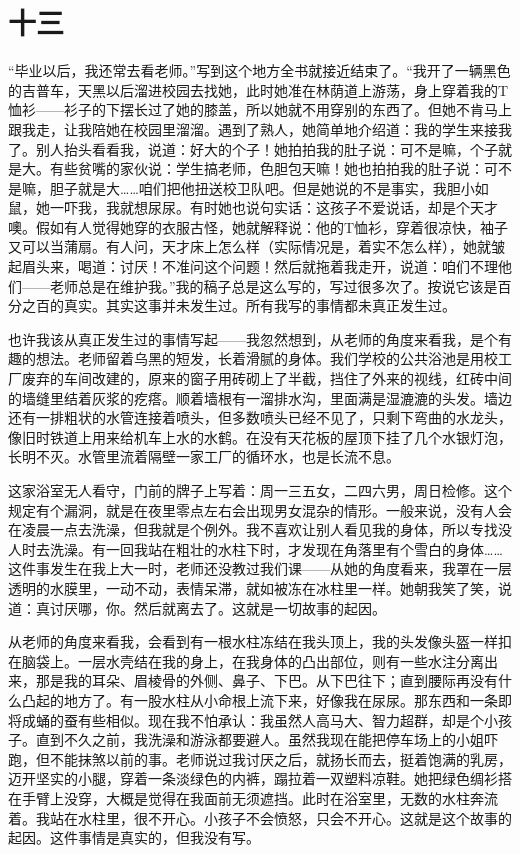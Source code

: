 \section*{十三}

“毕业以后，我还常去看老师。”写到这个地方全书就接近结束了。“我开了一辆黑色的吉普车，天黑以后溜进校园去找她，此时她准在林荫道上游荡，身上穿着我的T恤衫——衫子的下摆长过了她的膝盖，所以她就不用穿别的东西了。但她不肯马上跟我走，让我陪她在校园里溜溜。遇到了熟人，她简单地介绍道：我的学生来接我了。别人抬头看看我，说道：好大的个子！她拍拍我的肚子说：可不是嘛，个子就是大。有些贫嘴的家伙说：学生搞老师，色胆包天嘛！她也拍拍我的肚子说：可不是嘛，胆子就是大……咱们把他扭送校卫队吧。但是她说的不是事实，我胆小如鼠，她一吓我，我就想尿尿。有时她也说句实话：这孩子不爱说话，却是个天才噢。假如有人觉得她穿的衣服古怪，她就解释说：他的T恤衫，穿着很凉快，袖子又可以当蒲扇。有人问，天才床上怎么样（实际情况是，着实不怎么样），她就皱起眉头来，喝道：讨厌！不准问这个问题！然后就拖着我走开，说道：咱们不理他们——老师总是在维护我。”我的稿子总是这么写的，写过很多次了。按说它该是百分之百的真实。其实这事并未发生过。所有我写的事情都未真正发生过。 

也许我该从真正发生过的事情写起——我忽然想到，从老师的角度来看我，是个有趣的想法。老师留着乌黑的短发，长着滑腻的身体。我们学校的公共浴池是用校工厂废弃的车间改建的，原来的窗子用砖砌上了半截，挡住了外来的视线，红砖中间的墙缝里结着灰浆的疙瘩。顺着墙根有一溜排水沟，里面满是湿漉漉的头发。墙边还有一排粗状的水管连接着喷头，但多数喷头已经不见了，只剩下弯曲的水龙头，像旧时铁道上用来给机车上水的水鹤。在没有天花板的屋顶下挂了几个水银灯泡，长明不灭。水管里流着隔壁一家工厂的循环水，也是长流不息。 

这家浴室无人看守，门前的牌子上写着：周一三五女，二四六男，周日检修。这个规定有个漏洞，就是在夜里零点左右会出现男女混杂的情形。一般来说，没有人会在凌晨一点去洗澡，但我就是个例外。我不喜欢让别人看见我的身体，所以专找没人时去洗澡。有一回我站在粗壮的水柱下时，才发现在角落里有个雪白的身体……这件事发生在我上大一时，老师还没教过我们课——从她的角度看来，我罩在一层透明的水膜里，一动不动，表情呆滞，就如被冻在冰柱里一样。她朝我笑了笑，说道：真讨厌哪，你。然后就离去了。这就是一切故事的起因。 

从老师的角度来看我，会看到有一根水柱冻结在我头顶上，我的头发像头盔一样扣在脑袋上。一层水壳结在我的身上，在我身体的凸出部位，则有一些水注分离出来，那是我的耳朵、眉棱骨的外侧、鼻子、下巴。从下巴往下；直到腰际再没有什么凸起的地方了。有一股水柱从小命根上流下来，好像我在尿尿。那东西和一条即将成蛹的蚕有些相似。现在我不怕承认：我虽然人高马大、智力超群，却是个小孩子。直到不久之前，我洗澡和游泳都要避人。虽然我现在能把停车场上的小姐吓跑，但不能抹煞以前的事。老师说过我讨厌之后，就扬长而去，挺着饱满的乳房，迈开坚实的小腿，穿着一条淡绿色的内裤，蹋拉着一双塑料凉鞋。她把绿色绸衫搭在手臂上没穿，大概是觉得在我面前无须遮挡。此时在浴室里，无数的水柱奔流着。我站在水柱里，很不开心。小孩子不会愤怒，只会不开心。这就是这个故事的起因。这件事情是真实的，但我没有写。 

